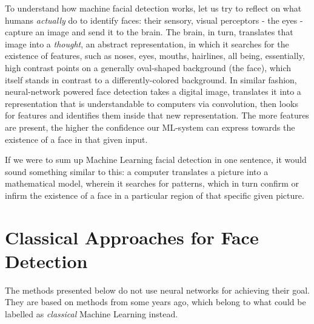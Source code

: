 To understand how machine facial detection works, let us try to reflect on what humans \textit{actually} do to identify faces: their sensory, visual perceptors - the eyes - capture an image and send it to the brain. The brain, in turn, translates that image into a \textit{thought}, an abstract representation, in which it searches for the existence of features, such as noses, eyes, mouths, hairlines, all being, essentially, high contrast points on a generally oval-shaped background (the face), which itself stands in contrast to a differently-colored background. In similar fashion, neural-network powered face detection takes a digital image, translates it into a representation that is understandable to computers via convolution, then looks for features and identifies them inside that new representation. The more features are present, the higher the confidence our ML-system can express towards the existence of a face in that given input. \par
If we were to sum up Machine Learning facial detection in one sentence, it would sound something similar to this: a computer translates a picture into a mathematical model, wherein it searches for patterns, which in turn confirm or infirm the existence of a face in a particular region of that specific given picture. \par

\section{Classical Approaches for Face Detection} 
The methods presented below do not use neural networks for achieving their goal. They are based on methods from some years ago, which belong to what could be labelled as \textit{classical} Machine Learning instead. \cite{classic_ml_quora}
